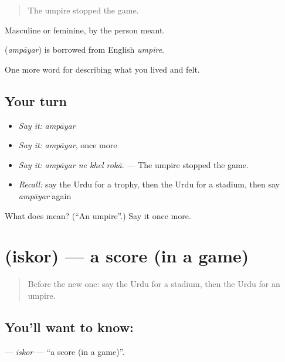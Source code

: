 \begin{quote}
The umpire stopped the game.
\end{quote}

Masculine or feminine, by the person meant.

\begin{cousinweb}
\textbf{} (\emph{ampāyar}) is borrowed from English \emph{umpire}.
\end{cousinweb}

\begin{grammarlens}[title={What you've built}]
One more word for describing what you lived and felt.
\end{grammarlens}

\subsection*{Your turn}
\begin{itemize}
\raggedright
  \item \emph{Say it:} \emph{ampāyar}
  \item \emph{Say it:} \emph{ampāyar}, once more
  \item \emph{Say it:} \emph{ampāyar ne khel rokā.} — The umpire stopped the game.
  \item \emph{Recall:} say the Urdu for a trophy, then the Urdu for a stadium, then say \emph{ampāyar} again
\end{itemize}

\begin{tcolorbox}[breakable,colback=teal!4,colframe=teal!35!black,title={Before you move on}]
What does  mean? (\textquotedblleft{}An umpire\textquotedblright{}.) Say it once more.
\end{tcolorbox}
\section[\texorpdfstring{\ur{اسکور} (iskor)}{اسکور (iskor)}]{ (iskor) — a score (in a game)}

\label{lesson:UR-C523-iskor}



\begin{quote}
Before the new one: say the Urdu for a stadium, then the Urdu for an umpire.
\end{quote}

\subsection*{You'll want to know: }
\textbf{} — \emph{iskor} — \textquotedblleft{}a score (in a game)\textquotedblright{}.

